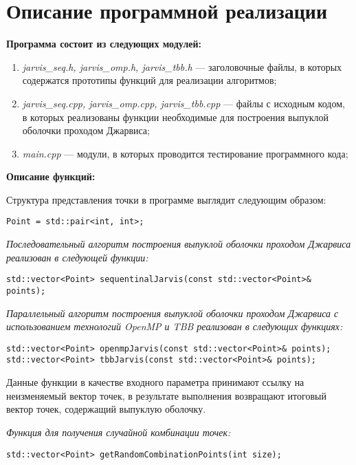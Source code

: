 \documentclass{report}
\begin{document}
\section*{Описание программной реализации}
\par \textbf{Программа состоит из следующих модулей:}
\begin{enumerate}
\item \textit{jarvis\_seq.h, jarvis\_omp.h, jarvis\_tbb.h} — заголовочные файлы, в которых содержатся прототипы функций для реализации алгоритмов;
\item \textit{jarvis\_seq.cpp, jarvis\_omp.cpp, jarvis\_tbb.cpp} — файлы с исходным кодом, в которых реализованы функции необходимые для построения выпуклой оболочки проходом Джарвиса;
\item \textit{main.cpp} — модули, в которых проводится тестирование программного кода;
\end{enumerate}
\par \textbf{Описание функций:}
\par Структура представления точки в программе выглядит следующим образом:
\begin{lstlisting}
Point = std::pair<int, int>;
\end{lstlisting}
\par \textit{Последовательный алгоритм построения выпуклой оболочки проходом Джарвиса реализован в следующей функции:}
\begin{lstlisting}
std::vector<Point> sequentinalJarvis(const std::vector<Point>& points);
\end{lstlisting}
\par \textit{Параллельный алгоритм построения выпуклой оболочки проходом Джарвиса с использованием технологий OpenMP и TBB реализован в следующих функциях:}
\begin{lstlisting}
std::vector<Point> openmpJarvis(const std::vector<Point>& points);
std::vector<Point> tbbJarvis(const std::vector<Point>& points);
\end{lstlisting}
Данные функции в качестве входного параметра принимают ссылку на неизменяемый вектор точек, в результате выполнения возвращают итоговый вектор точек, содержащий выпуклую оболочку.
\par \textit{Функция для получения случайной комбинации точек:}
\begin{lstlisting}
std::vector<Point> getRandomCombinationPoints(int size);
\end{lstlisting}
\end{document}
